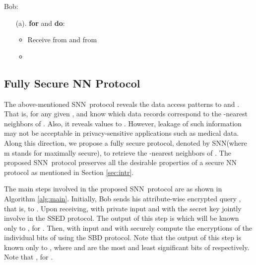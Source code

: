 \documentclass{article}
\newcommand{\sknnb}{SNN}
\newcommand{\sknnm}{SNN}
\begin{document}
\begin{algorithm}[!htbp]
\begin{algorithmic}[1]
\STATE  Bob:
\begin{enumerate}\itemsep=0pt
     \item[(a).] \textbf{for}  and  \textbf{do}:
       \begin{itemize}
                \item Receive  from  and  from      
                \item 
       \end{itemize}           
\end{enumerate}

\end{algorithmic}
\caption{SNN}
\label{alg:basic}
\end{algorithm} 

\subsection{Fully Secure NN Protocol}\label{sec:method}
The above-mentioned \sknnb~protocol reveals the data access patterns to  and . 
That is, for any given ,   and  know which data records 
correspond to the -nearest neighbors of . Also, 
it reveals  values to . However, leakage of such information may not be acceptable 
in privacy-sensitive applications such as medical data. Along this direction, 
we propose a fully secure protocol, denoted by \sknnm (where m stands for maximally secure), to retrieve 
the -nearest neighbors of . The proposed \sknnm~protocol preserves all 
the desirable properties of a secure NN protocol as mentioned in Section \ref{sec:intr}.

The main steps involved in the proposed \sknnm~protocol are as shown 
in Algorithm \ref{alg:main}. Initially, Bob sends his attribute-wise encrypted query , that 
is,   
to . Upon receiving,  with private input  
and  with the secret key  jointly involve in the SSED protocol. The output 
of this step is  which will be known only to , for 
. Then,  with input  and  with  securely 
compute the encryptions of the individual bits of  using the SBD protocol. Note 
that the output of this step  is known 
only to , where  and  are the most 
and least significant bits of  respectively. Note that , for . 
\end{document}
